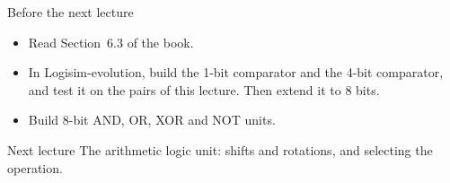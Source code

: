 \documentclass[10pt]{wosm-slides}
\begin{document}
\begin{frame}{Before the next lecture}
  \begin{itemize}
    \item Read Section~6.3 of the book.
    \item In Logisim-evolution, build the 1-bit comparator and the 4-bit comparator,
      and test it on the pairs of this lecture. Then extend it to 8 bits.
    \item Build 8-bit AND, OR, XOR and NOT units.
  \end{itemize}

  \begin{block}{Next lecture }
    The arithmetic logic unit: shifts and rotations, and selecting the operation.
  \end{block}
\end{frame}
\end{document}
